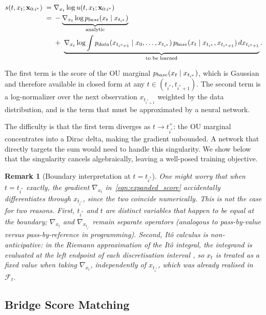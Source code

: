 \documentclass{article}
\newcommand{\pdata}{p_{\normalfont{data}}}
\newcommand{\pbase}{p_{\normalfont{base}}}
\newtheorem{remark}{Remark}
\begin{document}
\begin{align}
    s(t, x_t; \mathbf{x}_{0:i^*})
    \;=\; &\nabla_{x_t}\log u(t, x_t; \mathbf{x}_{0:i^*})\\
    \;=\;
    &-\underbrace{\nabla_{x_t}\log \pbase(x_t \mid x_{t_{i^*}})}_{\text{analytic}}
    \nonumber \\
    &+\; \underbrace{\nabla_{x_t}\log \int
      \pdata(x_{t_{i^*+1}} \mid x_0, \ldots, x_{t_{i^*}})\,
      \pbase(x_t \mid x_{t_{i^*}}, x_{t_{i^*+1}})\,
      dx_{t_{i^*+1}}}_{\text{to be learned}}.
    \label{eqn:expanded_score}
\end{align}

The first term is the score of the OU marginal $\pbase(x_t \mid x_{t_{i^*}})$, which is Gaussian and therefore available in closed form at any $t \in (t_{i^*}, t_{i^*+1})$.  The second term is a log-normalizer over the next observation $x_{t_{i^*+1}}$ weighted by the data distribution, and is the term that must be approximated by a neural network.

The difficulty is that the first term diverges as $t \to t_{i^*}^+$: the OU marginal concentrates into a Dirac delta, making the gradient unbounded.  A network that directly targets the sum would need to handle this singularity.  We show below that the singularity cancels algebraically, leaving a well-posed training objective.

\bigskip

\begin{remark}[Boundary interpretation at $t = t_{i^*}$]
One might worry that when $t = t_{i^*}$ exactly, the gradient $\nabla_{x_t}$ in~\eqref{eqn:expanded_score} accidentally differentiates through $x_{t_{i^*}}$, since the two coincide numerically.  This is not the case for two reasons.  First, $t_{i^*}$ and $t$ are distinct variables that happen to be equal at the boundary; $\nabla_{x_t}$ and $\nabla_{x_{t_{i^*}}}$ remain separate operators (analogous to pass-by-value versus pass-by-reference in programming).  Second, It\^o calculus is non-anticipative: in the Riemann approximation of the It\^o integral, the integrand is evaluated at the left endpoint of each discretisation interval \cite{steele2001stochastic}, so $x_t$ is treated as a fixed value when taking $\nabla_{x_t}$, independently of $x_{t_{i^*}}$, which was already realised in $\mathcal{F}_t$.
\end{remark}

\subsection{Bridge Score Matching}
\label{sec:learn_score}
\end{document}
